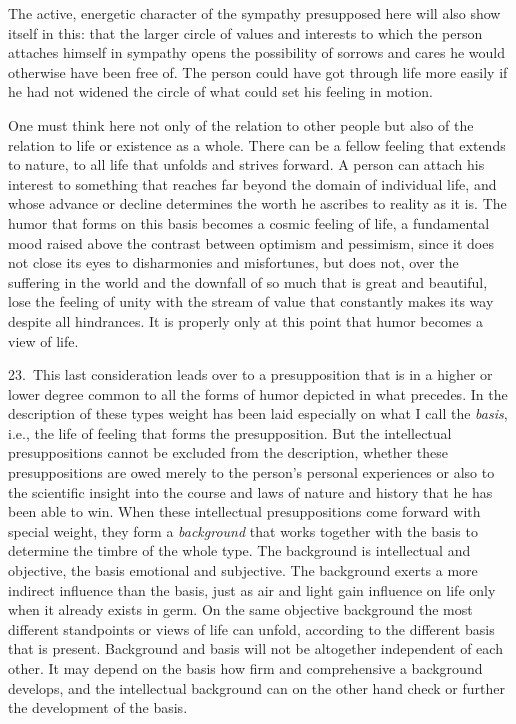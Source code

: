 \documentclass[12pt]{book}
\newcommand{\opage}[1]{\marginnote{\footnotesize\textit{[#1]}}}
\begin{document}
The active, energetic character of the sympathy presupposed here will also show itself
in this: that the larger circle of values and interests to which the person attaches
himself in sympathy opens the possibility of sorrows and cares he would otherwise have
been free of. The person could have got through life more easily if he had not widened
the circle of what could set his feeling in motion.

One must think here not only of the relation to other people but also of the relation
to life or existence as a whole. There can be a fellow feeling that extends to nature,
to all life that unfolds and strives forward. A person can attach his interest to
something that reaches far beyond the domain of individual life, and whose advance or
decline determines the worth he ascribes to reality as it is. The humor that forms on
this basis becomes a cosmic feeling of life, a fundamental mood raised above the
contrast between optimism and pessimism, since it does not close its eyes to
disharmonies and misfortunes, but does not, over the suffering in the world and the
downfall of so much that is great and beautiful, lose the feeling of unity with the
stream of value that constantly makes its way despite all hindrances. It is properly
only at this point that humor becomes a view of life.

23.~This last consideration leads over to a presupposition that is in a higher or
lower degree common to all the forms of humor depicted in what precedes. In the
description of \opage{86}these types weight has been laid especially on what I call
the \emph{basis}, i.e., the life of feeling that forms the presupposition. But the
intellectual presuppositions cannot be excluded from the description, whether these
presuppositions are owed merely to the person's personal experiences or also to the
scientific insight into the course and laws of nature and history that he has been
able to win. When these intellectual presuppositions come forward with special weight,
they form a \emph{background} that works together with the basis to determine the
timbre of the whole type. The background is intellectual and objective, the basis
emotional and subjective. The background exerts a more indirect influence than the
basis, just as air and light gain influence on life only when it already exists in
germ. On the same objective background the most different standpoints or views of life
can unfold, according to the different basis that is present. Background and basis will
not be altogether independent of each other. It may depend on the basis how firm and
comprehensive a background develops, and the intellectual background can on the other
hand check or further the development of the basis.
\end{document}

